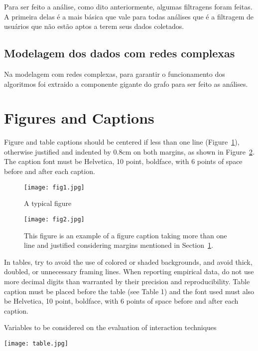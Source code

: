 \documentclass[12pt]{article}
\begin{document}
Para ser feito a análise, como dito anteriormente, algumas filtragens foram feitas. A primeira delas é a mais básica que vale para todas análises que é a filtragem de usuários que não estão aptos a terem seus dados coletados.

\subsection{Modelagem dos dados com redes complexas}

Na modelagem com redes complexas, para garantir o funcionamento dos algoritmos foi extraido a componente gigante do grafo para ser feito as análises.

\section{Figures and Captions}\label{sec:figs}


Figure and table captions should be centered if less than one line
(Figure~\ref{fig:exampleFig1}), otherwise justified and indented by 0.8cm on
both margins, as shown in Figure~\ref{fig:exampleFig2}. The caption font must
be Helvetica, 10 point, boldface, with 6 points of space before and after each
caption.

\begin{figure}[ht]
\centering
\texttt{[image: fig1.jpg]}
\caption{A typical figure}
\label{fig:exampleFig1}
\end{figure}

\begin{figure}[ht]
\centering
\texttt{[image: fig2.jpg]}
\caption{This figure is an example of a figure caption taking more than one
  line and justified considering margins mentioned in Section~\ref{sec:figs}.}
\label{fig:exampleFig2}
\end{figure}

In tables, try to avoid the use of colored or shaded backgrounds, and avoid
thick, doubled, or unnecessary framing lines. When reporting empirical data,
do not use more decimal digits than warranted by their precision and
reproducibility. Table caption must be placed before the table (see Table 1)
and the font used must also be Helvetica, 10 point, boldface, with 6 points of
space before and after each caption.

\begin{table}[ht]
\centering
\caption{Variables to be considered on the evaluation of interaction
  techniques}
\label{tab:exTable1}
\texttt{[image: table.jpg]}
\end{table}
\end{document}

